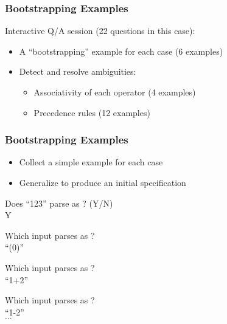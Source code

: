 \begin{frame}[fragile]
\frametitle{Bootstrapping Examples}
  Interactive Q/A session (22 questions in this case):

\begin{itemize}
  \item A ``bootstrapping'' example for each case (6 examples)
  \item {Detect and resolve ambiguities:
    \begin{itemize}
      \item Associativity of each operator (4 examples)
      \item Precedence rules (12 examples)
    \end{itemize}
  }
\end{itemize}

\end{frame}

\begin{frame}[fragile]
\frametitle{Bootstrapping Examples}

\begin{itemize}
\item Collect a simple example for each case
\item Generalize to produce an initial specification
\end{itemize}

\vspace{5mm}

\Q Does ``123'' parse as ? (Y/N)\\
\A Y
\vspace{2mm}

\Q Which input parses as ?\\
\A ``(0)''\\
\vspace{2mm}

\Q Which input parses as ?\\
\A ``1+2''\\
\vspace{2mm}

\Q Which input parses as ?\\
\A ``1-2''\\

$\dots$

\end{frame}

